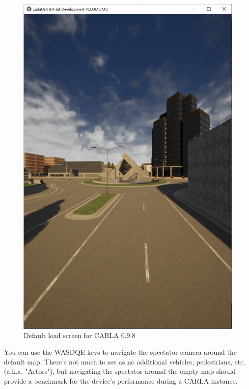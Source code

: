 \documentclass[12pt,oneside,letterpaper]{article}
\begin{document}
\begin{figure}[h]
\centering
\includegraphics[scale=0.5]{CARLA_0_9_8 Default_Screen}
\caption{Default load screen for CARLA 0.9.8}
\label{fig:default_load}
\end{figure}

You can use the WASDQE keys to navigate the spectator camera around the default map. There's not much to see as no additional vehicles, pedestrians, etc. (a.k.a. "Actors"), but navigating the spectator around the empty map should provide a benchmark for the device's performance during a CARLA instance.
\end{document}
